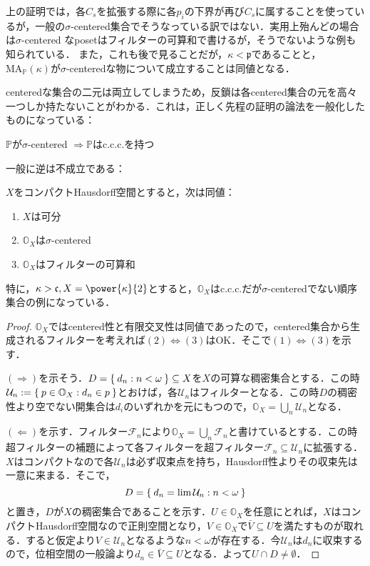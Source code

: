 \documentclass[a4j]{bxjsarticle}
\newcommand{\MA}{\mathrm{MA}}
\theoremstyle{definition}
\begin{document}
上の証明では，各$C_s$を拡張する際に各$p_i$の下界が再び$C_s$に属することを使っているが，一般の$\sigma$-centered集合でそうなっている訳ではない．実用上殆んどの場合は$\sigma$-centered なposetはフィルターの可算和で書けるが，そうでないような例も知られている．
また，これも後で見ることだが，$\kappa < \mathfrak{p}$であることと，$\MA_\mathbb{P}(\kappa)$が$\sigma$-centeredな物について成立することは同値となる．

centeredな集合の二元は両立してしまうため，反鎖は各centered集合の元を高々一つしか持たないことがわかる．これは，正しく先程の証明の論法を一般化したものになっている：
\begin{lemma}
 $\mathbb{P}$が$\sigma$-centered $\Rightarrow \mathbb{P}$はc.c.c.を持つ
\end{lemma}

一般に逆は不成立である：

\begin{exercise}
 $X$をコンパクトHausdorff空間とすると，次は同値：
 \begin{enumerate}[label=(\arabic*)]
  \item $X$は可分\label{cond:X-separable}
  \item $\mathbb{O}_X$は$\sigma$-centered\label{OX:sigma-centered}
  \item $\mathbb{O}_X$はフィルターの可算和\label{OX:countable-union-of-filters}
 \end{enumerate}

 特に，$\kappa > \mathfrak{c}, X = \power{\kappa}{2}$とすると，$\mathbb{O}_X$はc.c.c.だが$\sigma$-centeredでない順序集合の例になっている．
\end{exercise}
\begin{proof}
 $\mathbb{O}_X$ではcentered性と有限交叉性は同値であったので，centered集合から生成されるフィルターを考えれば$(2) \Leftrightarrow (3)$はOK．そこで$(1) \Leftrightarrow (3)$を示す．

 $(\Rightarrow)$を示そう．$D = \Set{d_n : n < \omega} \subseteq X$を$X$の可算な稠密集合とする．この時$\mathcal{U}_n \mathrel{:=} \Set{ p \in \mathbb{O}_X : d_n \in p }$とおけば，各$\mathcal{U}_n$はフィルターとなる．この時$D$の稠密性より空でない開集合は$d_i$のいずれかを元にもつので，$\mathbb{O}_X = \bigcup_n \mathcal{U}_n$となる．

 $(\Leftarrow)$を示す．フィルター$\mathcal{F}_n$により$\mathbb{O}_X = \bigcup_n \mathcal{F}_n$と書けているとする．この時超フィルターの補題によって各フィルターを超フィルター$\mathcal{F}_n \subseteq \mathcal{U}_n$に拡張する．$X$はコンパクトなので各$\mathcal{U}_n$は必ず収束点を持ち，Hausdorff性よりその収束先は一意に来まる．そこで，
 \[
  D = \Set{ d_n = \lim \mathcal{U}_n : n < \omega}
 \]
 と置き，$D$が$X$の稠密集合であることを示す．$U \in \mathbb{O}_X$を任意にとれば，$X$はコンパクトHausdorff空間なので正則空間となり，$V \in \mathbb{O}_X$で$\bar{V} \subseteq U$を満たすものが取れる．すると仮定より$V \in \mathcal{U}_n$となるような$n < \omega$が存在する．今$\mathcal{U}_n$は$d_n$に収束するので，位相空間の一般論より$d_n \in \bar{V} \subseteq U$となる．よって$U \cap D \neq \emptyset$．\mbox{}
\end{proof}
\end{document}
